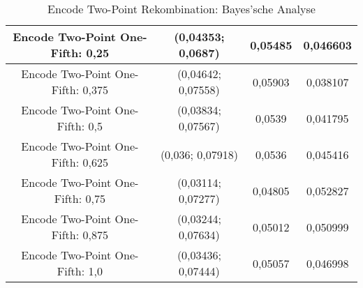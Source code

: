 \begin{table}[H]
\begin{tabular}{c | c | c | c}
		\hline
		Encode Two-Point One-Fifth: 0,25 & \color{Green}(0,04353; 0,0687)\color{black} & 0,05485 & 0,046603\\
		\hline
		Encode Two-Point One-Fifth: 0,375 & \color{Green}(0,04642; 0,07558)\color{black} & 0,05903 & 0,038107\\
		\hline
		Encode Two-Point One-Fifth: 0,5 & (0,03834; 0,07567) & 0,0539 & 0,041795\\
		\hline
		Encode Two-Point One-Fifth: 0,625 & (0,036; 0,07918) & 0,0536 & 0,045416\\
		\hline
		Encode Two-Point One-Fifth: 0,75 & (0,03114; 0,07277) & 0,04805 & \color{Green}0,052827\color{black}\\
		\hline
		Encode Two-Point One-Fifth: 0,875 & (0,03244; 0,07634) & 0,05012 & 0,050999\\
		\hline
		Encode Two-Point One-Fifth: 1,0 & (0,03436; 0,07444) & 0,05057 & 0,046998\\
	\end{tabular}
	\caption{Encode Two-Point Rekombination: Bayes'sche Analyse}
	\label{table:encodeTwoPointBayesian}
\end{table}

